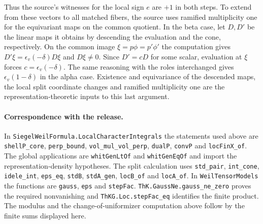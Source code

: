 Thus the source's witnesses for the local sign \(e\) are \(+1\) in
both steps. To extend from these vectors to all matched fibers,
the source uses ramified multiplicity one for the equivariant
maps on the common quotient. In the beta case, let \(D,D'\) be
the linear maps it obtains by descending the evaluation and the
cone, respectively. On the common image \(\xi=p\phi=p'\phi'\)
the computation gives \(D'\xi=\epsilon_v(-\delta)D\xi\) and
\(D\xi\ne0\). Since \(D'=cD\) for some scalar, evaluation at
\(\xi\) forces \(c=\epsilon_v(-\delta)\). The same reasoning
with the roles interchanged gives \(\epsilon_v(1-\delta)\) in
the alpha case. Existence and equivariance of the descended maps,
the local split coordinate changes and ramified multiplicity one
are the representation-theoretic inputs to this last argument.

\paragraph{Correspondence with the release.}
In \texttt{SiegelWeilFormula.LocalCharacterIntegrals} the statements
used above are \texttt{shellP\_core}, \texttt{perp\_bound},
\texttt{vol\_mul\_vol\_perp}, \texttt{dualP}, \texttt{convP} and
\texttt{locFinX\_of}. The global applications are
\texttt{whitGenLtOf} and \texttt{whitGenEqOf} and import the
representation-density hypotheses. The split calculation uses \texttt{std\_pair}, \texttt{int\_cone}, \texttt{idele\_int}, \texttt{eps\_eq}, \texttt{stdB}, \texttt{stdA\_gen}, \texttt{locB\_of} and \texttt{locA\_of}. In \texttt{WeilTensorModels}
the functions are \texttt{gauss}, \texttt{eps} and \texttt{stepFac}.
\texttt{ThK.GaussNe.gauss\_ne\_zero} proves the required
nonvanishing and \texttt{ThKG.Loc.stepFac\_eq} identifies the finite
product. The modulus and the change-of-uniformizer computation above
follow by the finite sums displayed here.
